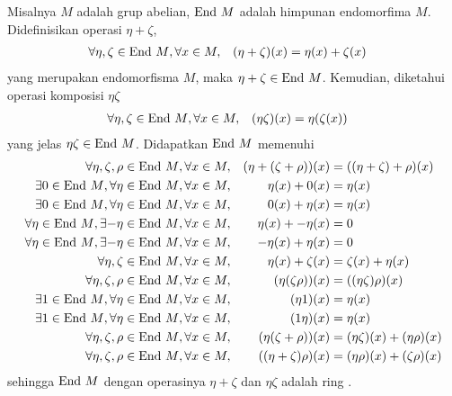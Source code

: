 \begin{defn}
Misalnya $M$ adalah grup abelian, ${\mathrm{End}\ M}$ adalah himpunan endomorfima $M$. Didefinisikan operasi ${\eta + \zeta}$,
\begin{align*}
	\forall \eta,\zeta \in {\mathrm{End}\ M}, \forall x \in M,&& (\eta + \zeta)(x) &= \eta(x) + \zeta(x)
\end{align*}
yang merupakan endomorfisma $M$, maka ${\eta + \zeta \in {\mathrm{End}\ M}}$. Kemudian, diketahui operasi komposisi $\eta\zeta$
\begin{align*}
	\forall \eta,\zeta \in {\mathrm{End}\ M}, \forall x \in M,&& (\eta\zeta)(x) &= \eta(\zeta(x))
\end{align*}
yang jelas $\eta\zeta \in {\mathrm{End}\ M}$. Didapatkan ${\mathrm{End}\ M}$ memenuhi
\begingroup
\allowdisplaybreaks
\begin{align*}
    \forall \eta,\zeta,\rho \in {\mathrm{End}\ M}, \forall x \in M,&& (\eta + (\zeta + \rho))(x) &= ((\eta + \zeta) + \rho)(x) \\
    \exists 0 \in {\mathrm{End}\ M}, \forall \eta \in {\mathrm{End}\ M}, \forall x \in M,&& \eta(x) + 0(x) &= \eta(x) \\
    \exists 0 \in {\mathrm{End}\ M}, \forall \eta \in {\mathrm{End}\ M}, \forall x \in M,&& 0(x) + \eta(x) &= \eta(x) \\
    \forall \eta \in {\mathrm{End}\ M}, \exists {-\eta} \in {\mathrm{End}\ M}, \forall x \in M,&& \eta(x) + {-\eta(x)} &= 0 \\
    \forall \eta \in {\mathrm{End}\ M}, \exists {-\eta} \in {\mathrm{End}\ M}, \forall x \in M,&& {-\eta(x)} + \eta(x) &= 0 \\
    \forall \eta,\zeta \in {\mathrm{End}\ M}, \forall x \in M,&& \eta(x) + \zeta(x) &= \zeta(x) + \eta(x) \\
    \forall \eta,\zeta,\rho \in {\mathrm{End}\ M}, \forall x \in M,&& (\eta(\zeta\rho))(x) &= ((\eta\zeta)\rho)(x) \\
    \exists 1 \in {\mathrm{End}\ M}, \forall \eta \in {\mathrm{End}\ M}, \forall x \in M,&& (\eta1)(x) &= \eta(x) \\
    \exists 1 \in {\mathrm{End}\ M}, \forall \eta \in {\mathrm{End}\ M}, \forall x \in M,&& (1\eta)(x) &= \eta(x) \\
    \forall \eta,\zeta,\rho \in {\mathrm{End}\ M}, \forall x \in M,&& (\eta(\zeta+\rho))(x) &= (\eta\zeta)(x) + (\eta\rho)(x) \\
    \forall \eta,\zeta,\rho \in {\mathrm{End}\ M}, \forall x \in M,&& ((\eta+\zeta)\rho)(x) &= (\eta\rho)(x) + (\zeta\rho)(x)
\end{align*}
\endgroup
sehingga ${\mathrm{End}\ M}$ dengan operasinya ${\eta + \zeta}$ dan $\eta\zeta$ adalah ring \citep{Jacobson1995}.
\end{defn}

